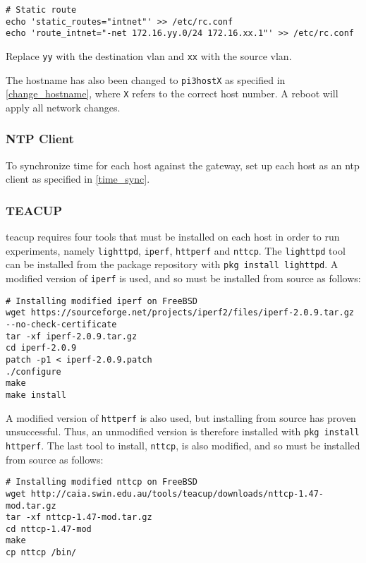 \begin{verbatim}
# Static route
echo 'static_routes="intnet"' >> /etc/rc.conf
echo 'route_intnet="-net 172.16.yy.0/24 172.16.xx.1"' >> /etc/rc.conf
\end{verbatim}

Replace \lstinline{yy} with the destination \gls{vlan} and \lstinline{xx} with the source \gls{vlan}.

The hostname has also been changed to \lstinline{pi3hostX} as specified in \ref{change_hostname}, where \lstinline{X} refers to the correct host number. A reboot will apply all network changes.


\subsubsection{NTP Client}

To synchronize time for each host against the gateway, set up each host as an \gls{ntp} client as specified in \ref{time_sync}.


\subsubsection{TEACUP}

\gls{teacup} requires four tools that must be installed on each host in order to run experiments, namely \lstinline{lighttpd},  \lstinline{iperf}, \lstinline{httperf} and \lstinline{nttcp}. The \lstinline{lighttpd} tool can be installed from the package repository with \lstinline{pkg install lighttpd}. A modified version of \lstinline{iperf} is used, and so must be installed from source as follows:

\begin{verbatim}
# Installing modified iperf on FreeBSD
wget https://sourceforge.net/projects/iperf2/files/iperf-2.0.9.tar.gz --no-check-certificate
tar -xf iperf-2.0.9.tar.gz
cd iperf-2.0.9
patch -p1 < iperf-2.0.9.patch
./configure
make
make install
\end{verbatim}


A modified version of \lstinline{httperf} is also used, but installing from source has proven unsuccessful. Thus, an unmodified version is therefore installed with \lstinline{pkg install httperf}. The last tool to install, \lstinline{nttcp}, is also modified, and so must be installed from source as follows:

\begin{verbatim}
# Installing modified nttcp on FreeBSD
wget http://caia.swin.edu.au/tools/teacup/downloads/nttcp-1.47-mod.tar.gz
tar -xf nttcp-1.47-mod.tar.gz
cd nttcp-1.47-mod
make
cp nttcp /bin/
\end{verbatim}










